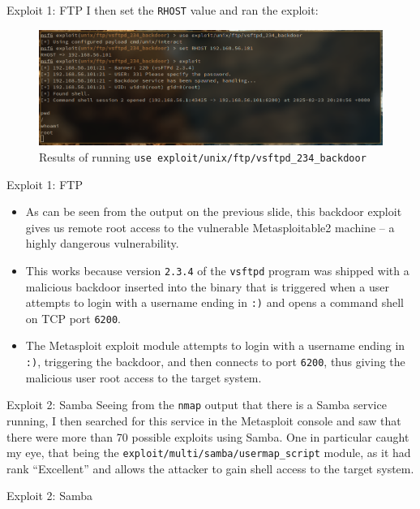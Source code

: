 \documentclass[]{beamer}
\begin{document}
\begin{frame}{Exploit 1: FTP}
    I then set the \texttt{RHOST} value and ran the exploit:

\begin{figure}[H]
    \centering
    \includegraphics[width=\textwidth]{./images/ftpexploit.png}
    \caption{Results of running \texttt{use exploit/unix/ftp/vsftpd\_234\_backdoor}}
\end{figure}
\end{frame}

\begin{frame}{Exploit 1: FTP}
    \begin{itemize}
        \item   As can be seen from the output on the previous slide, this backdoor exploit gives us remote root access to the vulnerable Metasploitable2 machine -- a highly dangerous vulnerability.
        \item   This works because version \texttt{2.3.4} of the \texttt{vsftpd} program was shipped with a malicious backdoor inserted into the binary that is triggered when a user attempts to login with a username ending in \texttt{:)} and opens a command shell on TCP port \texttt{6200}.
        \item   The Metasploit exploit module attempts to login with a username ending in \texttt{:)}, triggering the backdoor, and then connects to port \texttt{6200}, thus giving the malicious user root access to the target system.
    \end{itemize}
\end{frame}

\begin{frame}{Exploit 2: Samba}
    Seeing from the \texttt{nmap} output that there is a Samba service running, I then searched for this service in the Metasploit console and saw that there were more than 70 possible exploits using Samba.
    One in particular caught my eye, that being the \texttt{exploit/multi/samba/usermap\_script} module, as it had rank ``Excellent'' and allows the attacker to gain shell access to the target system.
\end{frame}

\begin{frame}{Exploit 2: Samba}
    
\end{frame}
\end{document}
